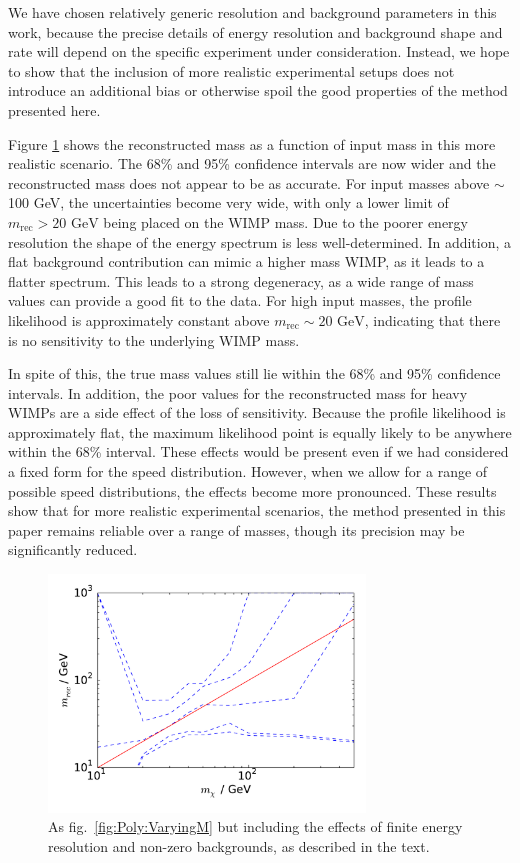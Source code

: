 We have chosen relatively generic resolution and background parameters in this work, because the precise details of energy resolution and background shape and rate will depend on the specific experiment under consideration. Instead, we hope to show that the inclusion of more realistic experimental setups does not introduce an additional bias or otherwise spoil the good properties of the method presented here.

Figure \ref{fig:Poly:VaryingM_real} shows the reconstructed mass as a function of input mass in this more realistic scenario. The 68\% and 95\% confidence intervals are now wider and the reconstructed mass does not appear to be as accurate. For input masses above $\sim$100 GeV, the uncertainties become very wide, with only a lower limit of $m_\textrm{rec} > 20 \textrm{ GeV}$ being placed on the WIMP mass.  Due to the poorer energy resolution the shape of the energy spectrum is less well-determined. In addition, a flat background contribution can mimic a higher mass WIMP, as it leads to a flatter spectrum. This leads to a strong degeneracy, as a wide range of mass values can provide a good fit to the data. For high input masses, the profile likelihood is approximately constant above $m_\textrm{rec} \sim 20 \textrm{ GeV}$, indicating that there is no sensitivity to the underlying WIMP mass.

In spite of this, the true mass values still lie within the 68\% and 95\% confidence intervals. In addition, the poor values for the reconstructed mass for heavy WIMPs are a side effect of the loss of sensitivity. Because the profile likelihood is approximately flat, the maximum likelihood point is equally likely to be anywhere within the 68\% interval. These effects would be present even if we had considered a fixed form for the speed distribution. However, when we allow for a range of possible speed distributions, the effects become more pronounced. These results show that for more realistic experimental scenarios, the method presented in this paper remains reliable over a range of masses, though its precision may be significantly reduced.

\begin{figure}[t]
\centering
  \includegraphics[width=0.75\textwidth]{Poly/VaryingM_real.pdf}
  \caption{As fig.~\ref{fig:Poly:VaryingM} but including the effects of finite energy resolution and non-zero backgrounds, as described in the text.}
  \label{fig:Poly:VaryingM_real}
\end{figure}

